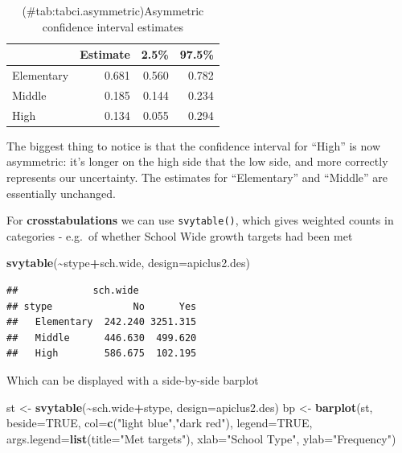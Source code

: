\documentclass[
]{book}
\newenvironment{Shaded}{\begin{snugshade}}{\end{snugshade}}
\newcommand{\AttributeTok}[1]{\textcolor[rgb]{0.13,0.29,0.53}{#1}}
\newcommand{\ConstantTok}[1]{\textcolor[rgb]{0.56,0.35,0.01}{#1}}
\newcommand{\FunctionTok}[1]{\textcolor[rgb]{0.13,0.29,0.53}{\textbf{#1}}}
\newcommand{\NormalTok}[1]{#1}
\newcommand{\OtherTok}[1]{\textcolor[rgb]{0.56,0.35,0.01}{#1}}
\newcommand{\SpecialCharTok}[1]{\textcolor[rgb]{0.81,0.36,0.00}{\textbf{#1}}}
\newcommand{\StringTok}[1]{\textcolor[rgb]{0.31,0.60,0.02}{#1}}
\begin{document}
\begin{table}
\centering
\caption{(\#tab:tabci.asymmetric)Asymmetric confidence interval estimates}
\centering
\begin{tabular}[t]{l|r|r|r}
\hline
  & Estimate & 2.5\% & 97.5\%\\
\hline
Elementary & 0.681 & 0.560 & 0.782\\
\hline
Middle & 0.185 & 0.144 & 0.234\\
\hline
High & 0.134 & 0.055 & 0.294\\
\hline
\end{tabular}
\end{table}

The biggest thing to notice is that the confidence interval for ``High''
is now asymmetric: it's longer on the high side that the low side, and
more correctly represents our uncertainty. The estimates for ``Elementary''
and ``Middle'' are essentially unchanged.

For \textbf{crosstabulations} we can use \texttt{svytable()}, which gives weighted
counts in categories - e.g.~of whether School Wide growth targets had been met

\begin{Shaded}
\begin{Highlighting}[]
\FunctionTok{svytable}\NormalTok{(}\SpecialCharTok{\textasciitilde{}}\NormalTok{stype}\SpecialCharTok{+}\NormalTok{sch.wide, }\AttributeTok{design=}\NormalTok{apiclus2.des)}
\end{Highlighting}
\end{Shaded}

\begin{verbatim}
##             sch.wide
## stype              No      Yes
##   Elementary  242.240 3251.315
##   Middle      446.630  499.620
##   High        586.675  102.195
\end{verbatim}

Which can be displayed with a side-by-side barplot

\begin{Shaded}
\begin{Highlighting}[]
\NormalTok{st }\OtherTok{\textless{}{-}} \FunctionTok{svytable}\NormalTok{(}\SpecialCharTok{\textasciitilde{}}\NormalTok{sch.wide}\SpecialCharTok{+}\NormalTok{stype, }\AttributeTok{design=}\NormalTok{apiclus2.des)}
\NormalTok{bp }\OtherTok{\textless{}{-}} \FunctionTok{barplot}\NormalTok{(st, }\AttributeTok{beside=}\ConstantTok{TRUE}\NormalTok{, }\AttributeTok{col=}\FunctionTok{c}\NormalTok{(}\StringTok{"light blue"}\NormalTok{,}\StringTok{"dark red"}\NormalTok{),}
              \AttributeTok{legend=}\ConstantTok{TRUE}\NormalTok{, }\AttributeTok{args.legend=}\FunctionTok{list}\NormalTok{(}\AttributeTok{title=}\StringTok{"Met targets"}\NormalTok{), }
              \AttributeTok{xlab=}\StringTok{"School Type"}\NormalTok{, }\AttributeTok{ylab=}\StringTok{"Frequency"}\NormalTok{)}
\end{Highlighting}
\end{Shaded}
\end{document}
